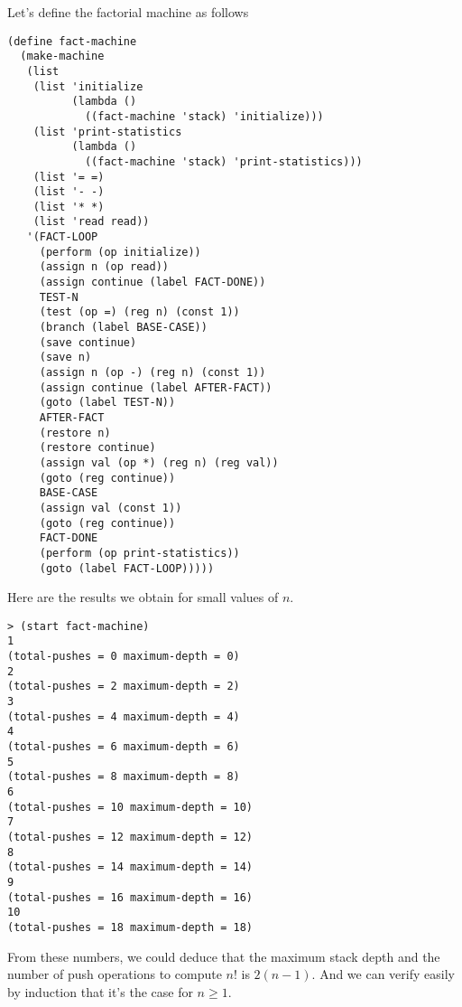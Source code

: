 \documentclass[a4paper,12pt]{article}
\begin{document}
Let's define the factorial machine as follows

\begin{lstlisting}
(define fact-machine
  (make-machine
   (list
    (list 'initialize
          (lambda ()
            ((fact-machine 'stack) 'initialize)))
    (list 'print-statistics
          (lambda ()
            ((fact-machine 'stack) 'print-statistics)))
    (list '= =)
    (list '- -)
    (list '* *)
    (list 'read read))
   '(FACT-LOOP
     (perform (op initialize))
     (assign n (op read))
     (assign continue (label FACT-DONE))
     TEST-N
     (test (op =) (reg n) (const 1))
     (branch (label BASE-CASE))
     (save continue)
     (save n)
     (assign n (op -) (reg n) (const 1))
     (assign continue (label AFTER-FACT))
     (goto (label TEST-N))
     AFTER-FACT
     (restore n)
     (restore continue)
     (assign val (op *) (reg n) (reg val))
     (goto (reg continue))
     BASE-CASE
     (assign val (const 1))
     (goto (reg continue))
     FACT-DONE
     (perform (op print-statistics))
     (goto (label FACT-LOOP)))))
\end{lstlisting}

Here are the results we obtain for small values of $n$.

\begin{lstlisting}
> (start fact-machine)
1
(total-pushes = 0 maximum-depth = 0)
2
(total-pushes = 2 maximum-depth = 2)
3
(total-pushes = 4 maximum-depth = 4)
4
(total-pushes = 6 maximum-depth = 6)
5
(total-pushes = 8 maximum-depth = 8)
6
(total-pushes = 10 maximum-depth = 10)
7
(total-pushes = 12 maximum-depth = 12)
8
(total-pushes = 14 maximum-depth = 14)
9
(total-pushes = 16 maximum-depth = 16)
10
(total-pushes = 18 maximum-depth = 18)
\end{lstlisting}

From these numbers, we could deduce that the maximum stack depth and
the number of push operations to compute $n!$ is $2(n-1)$.  And we can
verify easily by induction that it's the case for $n\ge1$.
\end{document}

